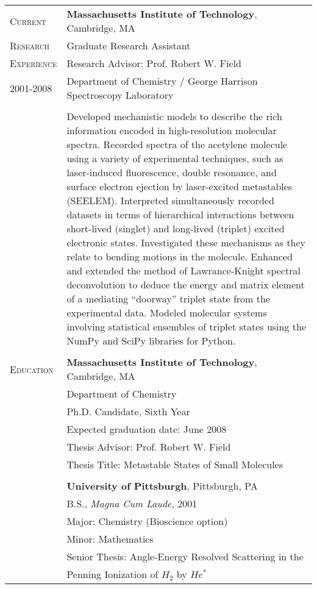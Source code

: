 \documentclass[12pt, letter]{article}
\begin{document}
\begin{tabular}{@{}l@{\extracolsep{1cm}}p{13.2cm}}
  \textsc{Current}
  & \textbf{Massachusetts Institute of Technology}, Cambridge, MA\\
  \textsc{Research}
  & Graduate Research Assistant\\
  \textsc{Experience}
  & Research Advisor: Prof. Robert W. Field\\
  \textsc{2001-2008} 
  & Department of Chemistry / George Harrison Spectroscopy Laboratory\\
  \\
  & Developed mechanistic models to describe
  the rich information encoded in high-resolution molecular spectra.
  Recorded spectra of the acetylene molecule using a variety of experimental
  techniques, such as laser-induced fluorescence, double resonance, and
  surface electron ejection by laser-excited metastables (SEELEM).
  Interpreted simultaneously recorded datasets in terms of hierarchical
  interactions between short-lived (singlet) and long-lived (triplet) 
  excited electronic states.
  Investigated these mechanisms as they relate to bending motions in the 
  molecule.
  Enhanced and extended the method of Lawrance-Knight spectral
  deconvolution to deduce the energy and matrix element of a mediating
  ``doorway'' triplet state from the experimental data.
  Modeled molecular systems involving statistical ensembles of triplet 
  states using the NumPy and SciPy libraries for Python.
  \\

  \\

\textsc{Education}
 & \textbf{Massachusetts Institute of Technology}, Cambridge, MA\\
 & Department of Chemistry \\
 & Ph.D. Candidate, Sixth Year \\
 & Expected graduation date: June 2008 \\
 & Thesis Advisor: Prof. Robert W. Field \\
 & Thesis Title: Metastable States of Small Molecules \\
 & \\
 & \textbf{University of Pittsburgh}, Pittsburgh, PA \\
 & B.S., \emph{Magna Cum Laude}, 2001 \\
 & Major: Chemistry (Bioscience option)\\
 & Minor: Mathematics\\
 & Senior Thesis: Angle-Energy Resolved Scattering in the\\
 & \hspace{5mm}Penning Ionization of $H_2$ by $He^*$\\
\end{tabular}
\end{document}
